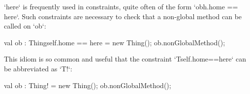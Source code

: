 \xcd`here` is frequently used in constraints, quite often of the form
\xcd`obh.home == here`. Such constraints are necessary to check that a
non-global method can be called on \xcd`ob`: 


\begin{xten}
val ob : Thing{self.home == here} = new Thing();
ob.nonGlobalMethod();
\end{xten}

This idiom is so common and useful that the constraint
\xcd`T{self.home==here}` can be abbreviated as \xcd`T!`: 

\begin{xten}
val ob : Thing! = new Thing();
ob.nonGlobalMethod();
\end{xten}



